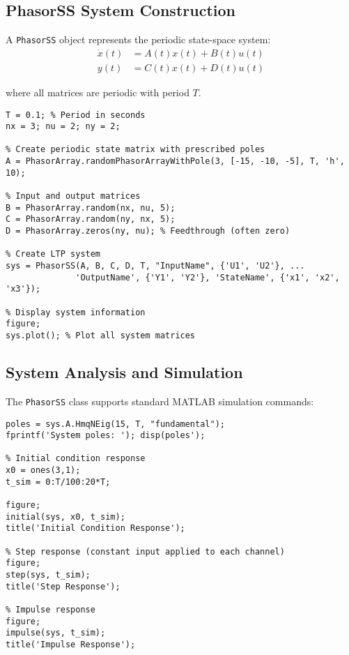 \documentclass[11pt,a4paper]{article}
\begin{document}
\subsection{PhasorSS System Construction}

A \texttt{PhasorSS} object represents the periodic state-space system:
\begin{align}
\dot{x}(t) &= A(t)x(t) + B(t)u(t) \\
y(t) &= C(t)x(t) + D(t)u(t)
\end{align}

where all matrices are periodic with period $T$.

\begin{lstlisting}[style=matlabstyle]
% Define periodic system matrices
T = 0.1; % Period in seconds
nx = 3; nu = 2; ny = 2;

% Create periodic state matrix with prescribed poles
A = PhasorArray.randomPhasorArrayWithPole(3, [-15, -10, -5], T, 'h', 10);

% Input and output matrices
B = PhasorArray.random(nx, nu, 5);
C = PhasorArray.random(ny, nx, 5);
D = PhasorArray.zeros(ny, nu); % Feedthrough (often zero)

% Create LTP system
sys = PhasorSS(A, B, C, D, T, "InputName", {'U1', 'U2'}, ...
              'OutputName', {'Y1', 'Y2'}, 'StateName', {'x1', 'x2', 'x3'});

% Display system information
figure;
sys.plot(); % Plot all system matrices
\end{lstlisting}

\subsection{System Analysis and Simulation}

The \texttt{PhasorSS} class supports standard MATLAB simulation commands:

\begin{lstlisting}[style=matlabstyle]
% Analyze system stability
poles = sys.A.HmqNEig(15, T, "fundamental");
fprintf('System poles: '); disp(poles');

% Initial condition response
x0 = ones(3,1);
t_sim = 0:T/100:20*T;

figure;
initial(sys, x0, t_sim);
title('Initial Condition Response');

% Step response (constant input applied to each channel)
figure;
step(sys, t_sim);
title('Step Response');

% Impulse response
figure;
impulse(sys, t_sim);
title('Impulse Response');
\end{lstlisting}
\end{document}
